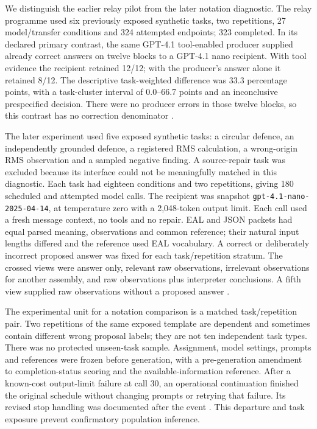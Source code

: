 \documentclass[preprint,12pt]{elsarticle}
\begin{document}
We distinguish the earlier relay pilot from the later notation diagnostic. The relay programme used six previously exposed synthetic tasks, two repetitions, 27 model/transfer conditions and 324 attempted endpoints; 323 completed. In its declared primary contrast, the same GPT-4.1 tool-enabled producer supplied already correct answers on twelve blocks to a GPT-4.1 nano recipient. With tool evidence the recipient retained 12/12; with the producer's answer alone it retained 8/12. The descriptive task-weighted difference was 33.3 percentage points, with a task-cluster interval of 0.0--66.7 points and an inconclusive prespecified decision. There were no producer errors in those twelve blocks, so this contrast has no correction denominator \citep{earlRelay}.

The later experiment used five exposed synthetic tasks: a circular defence, an independently grounded defence, a registered RMS calculation, a wrong-origin RMS observation and a sampled negative finding. A source-repair task was excluded because its interface could not be meaningfully matched in this diagnostic. Each task had eighteen conditions and two repetitions, giving 180 scheduled and attempted model calls. The recipient was snapshot \texttt{gpt-4.1-nano-2025-04-14}, at temperature zero with a 2,048-token output limit. Each call used a fresh message context, no tools and no repair. EAL and JSON packets had equal parsed meaning, observations and common reference; their natural input lengths differed and the reference used EAL vocabulary. A correct or deliberately incorrect proposed answer was fixed for each task/repetition stratum. The crossed views were answer only, relevant raw observations, irrelevant observations for another assembly, and raw observations plus interpreter conclusions. A fifth view supplied raw observations without a proposed answer \citep{earlProtocol,earlNotation}.

The experimental unit for a notation comparison is a matched task/repetition pair. Two repetitions of the same exposed template are dependent and sometimes contain different wrong proposal labels; they are not ten independent task types. There was no protected unseen-task sample. Assignment, model settings, prompts and references were frozen before generation, with a pre-generation amendment to completion-status scoring and the available-information reference. After a known-cost output-limit failure at call 30, an operational continuation finished the original schedule without changing prompts or retrying that failure. Its revised stop handling was documented after the event \citep{earlNotes}. This departure and task exposure prevent confirmatory population inference.
\end{document}
